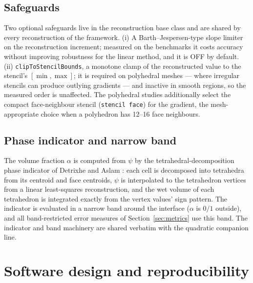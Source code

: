 \documentclass[preprint,3p,11pt]{elsarticle}
\newcommand{\psilev}{\psi}
\begin{document}
\subsection{Safeguards}
\label{sec:safeguards}
Two optional safeguards live in the reconstruction base class and are shared
by every reconstruction of the framework. (i) A Barth--Jespersen-type slope
limiter on the reconstruction increment; measured on the benchmarks it costs
accuracy without improving robustness for the linear method, and it is OFF
by default. (ii) \texttt{clipToStencilBounds}, a monotone clamp of the
reconstructed value to the stencil's $[\min,\max]$; it is required on
polyhedral meshes --- where irregular stencils can produce outlying
gradients --- and inactive in smooth regions, so the measured order is
unaffected. The polyhedral studies additionally select the compact
face-neighbour stencil (\texttt{stencil face}) for the gradient, the
mesh-appropriate choice when a polyhedron has 12--16 face neighbours.

\subsection{Phase indicator and narrow band}
\label{sec:indicator}
The volume fraction $\alpha$ is computed from $\psilev$ by the
tetrahedral-decomposition phase indicator of Detrixhe and Aslam
\cite{detrixhe2016}: each cell is decomposed into tetrahedra from its
centroid and face centroids, $\psilev$ is interpolated to the tetrahedron
vertices from a linear least-squares reconstruction, and the wet volume of
each tetrahedron is integrated exactly from the vertex values' sign
pattern. The indicator is evaluated in a narrow band around the interface
($\alpha$ is $0/1$ outside), and all band-restricted error measures of
Section~\ref{sec:metrics} use this band. The indicator and band machinery
are shared verbatim with the quadratic companion line.

\section{Software design and reproducibility}
\label{sec:software}
\end{document}
